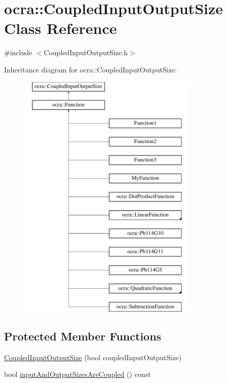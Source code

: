 \hypertarget{classocra_1_1CoupledInputOutputSize}{}\section{ocra\+:\+:Coupled\+Input\+Output\+Size Class Reference}
\label{classocra_1_1CoupledInputOutputSize}


{\ttfamily \#include $<$Coupled\+Input\+Output\+Size.\+h$>$}

Inheritance diagram for ocra\+:\+:Coupled\+Input\+Output\+Size\+:\begin{figure}[H]
\begin{center}
\leavevmode
\includegraphics[height=12.000000cm]{d5/dc0/classocra_1_1CoupledInputOutputSize}
\end{center}
\end{figure}
\subsection*{Protected Member Functions}
\begin{DoxyCompactItemize}
\item 
\hyperlink{classocra_1_1CoupledInputOutputSize_a464c947e199233598a248ff6409ab93d}{Coupled\+Input\+Output\+Size} (bool coupled\+Input\+Output\+Size)
\item 
bool \hyperlink{classocra_1_1CoupledInputOutputSize_a10e82ae3bbe410a29f7ed5a54ac105b0}{input\+And\+Output\+Sizes\+Are\+Coupled} () const
\end{DoxyCompactItemize}



